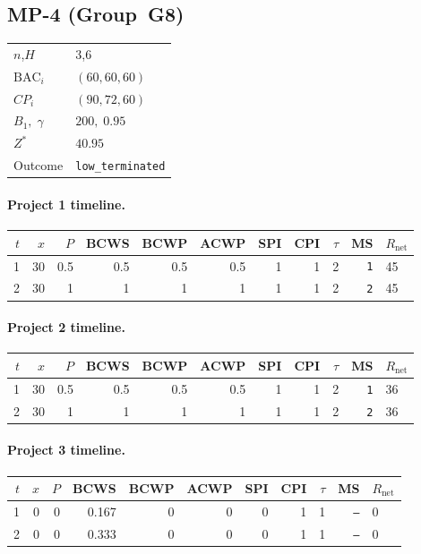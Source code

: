 \documentclass[12pt, a4paper]{article}
\newcommand{\BAC}{\mathrm{BAC}}
\begin{document}
\newpage

\subsection*{MP-4  (Group~G8)}
\begin{center}
\begin{tabular}{ll}
\toprule
$n$,\;$H$ & $3$,\;$6$ \\
$\BAC_i$ & $(60, 60, 60)$ \\
$CP_i$   & $(90, 72, 60)$ \\
$B_1,\;\gamma$ & $200,\;0.95$ \\
$Z^*$ & $40.95$ \\
Outcome & \texttt{low_terminated} \\
\bottomrule
\end{tabular}
\end{center}

\paragraph{Project 1 timeline.}
\begin{center}
\begin{tabular}{rrrrrrrrrrl}
\toprule
$t$ & $x$ & $P$ & BCWS & BCWP & ACWP & SPI & CPI & $\tau$ & MS & $R_{\mathrm{net}}$\\
\midrule
1 & 30 & 0.5 & 0.5 & 0.5 & 0.5 & 1 & 1 & 2 & \texttt{1} & 45 \\
2 & 30 & 1 & 1 & 1 & 1 & 1 & 1 & 2 & \texttt{2} & 45 \\
\bottomrule
\end{tabular}
\end{center}
\paragraph{Project 2 timeline.}
\begin{center}
\begin{tabular}{rrrrrrrrrrl}
\toprule
$t$ & $x$ & $P$ & BCWS & BCWP & ACWP & SPI & CPI & $\tau$ & MS & $R_{\mathrm{net}}$\\
\midrule
1 & 30 & 0.5 & 0.5 & 0.5 & 0.5 & 1 & 1 & 2 & \texttt{1} & 36 \\
2 & 30 & 1 & 1 & 1 & 1 & 1 & 1 & 2 & \texttt{2} & 36 \\
\bottomrule
\end{tabular}
\end{center}
\paragraph{Project 3 timeline.}
\begin{center}
\begin{tabular}{rrrrrrrrrrl}
\toprule
$t$ & $x$ & $P$ & BCWS & BCWP & ACWP & SPI & CPI & $\tau$ & MS & $R_{\mathrm{net}}$\\
\midrule
1 & 0 & 0 & 0.167 & 0 & 0 & 0 & 1 & 1 & \texttt{---} & 0 \\
2 & 0 & 0 & 0.333 & 0 & 0 & 0 & 1 & 1 & \texttt{---} & 0 \\
\bottomrule
\end{tabular}
\end{center}
\end{document}
